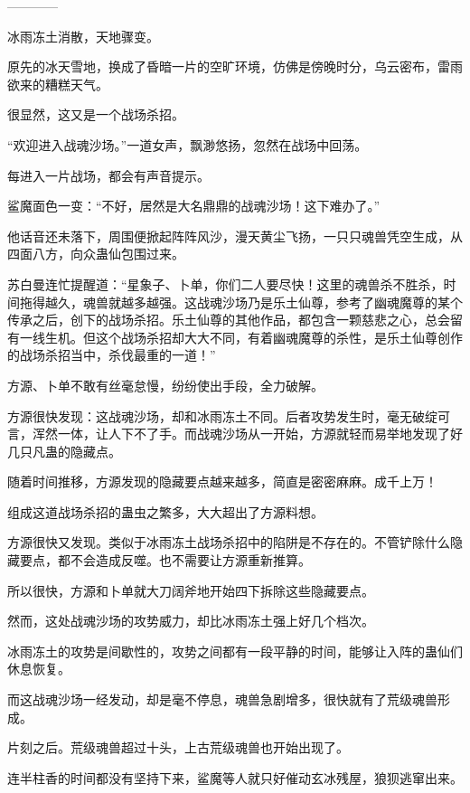 
\begin{this_body}

------------

冰雨冻土消散，天地骤变。

原先的冰天雪地，换成了昏暗一片的空旷环境，仿佛是傍晚时分，乌云密布，雷雨欲来的糟糕天气。

很显然，这又是一个战场杀招。

“欢迎进入战魂沙场。”一道女声，飘渺悠扬，忽然在战场中回荡。

每进入一片战场，都会有声音提示。

鲨魔面色一变：“不好，居然是大名鼎鼎的战魂沙场！这下难办了。”

他话音还未落下，周围便掀起阵阵风沙，漫天黄尘飞扬，一只只魂兽凭空生成，从四面八方，向众蛊仙包围过来。

苏白曼连忙提醒道：“星象子、卜单，你们二人要尽快！这里的魂兽杀不胜杀，时间拖得越久，魂兽就越多越强。这战魂沙场乃是乐土仙尊，参考了幽魂魔尊的某个传承之后，创下的战场杀招。乐土仙尊的其他作品，都包含一颗慈悲之心，总会留有一线生机。但这个战场杀招却大大不同，有着幽魂魔尊的杀性，是乐土仙尊创作的战场杀招当中，杀伐最重的一道！”

方源、卜单不敢有丝毫怠慢，纷纷使出手段，全力破解。

方源很快发现：这战魂沙场，却和冰雨冻土不同。后者攻势发生时，毫无破绽可言，浑然一体，让人下不了手。而战魂沙场从一开始，方源就轻而易举地发现了好几只凡蛊的隐藏点。

随着时间推移，方源发现的隐藏要点越来越多，简直是密密麻麻。成千上万！

组成这道战场杀招的蛊虫之繁多，大大超出了方源料想。

方源很快又发现。类似于冰雨冻土战场杀招中的陷阱是不存在的。不管铲除什么隐藏要点，都不会造成反噬。也不需要让方源重新推算。

所以很快，方源和卜单就大刀阔斧地开始四下拆除这些隐藏要点。

然而，这处战魂沙场的攻势威力，却比冰雨冻土强上好几个档次。

冰雨冻土的攻势是间歇性的，攻势之间都有一段平静的时间，能够让入阵的蛊仙们休息恢复。

而这战魂沙场一经发动，却是毫不停息，魂兽急剧增多，很快就有了荒级魂兽形成。

片刻之后。荒级魂兽超过十头，上古荒级魂兽也开始出现了。

连半柱香的时间都没有坚持下来，鲨魔等人就只好催动玄冰残屋，狼狈逃窜出来。


\end{this_body}
